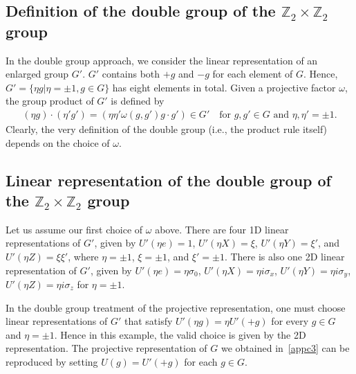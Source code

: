 \documentclass[3p,preprint]{elsarticle}
\begin{document}
\subsection{Definition of the double group of the $\mathbb{Z}_2\times\mathbb{Z}_2$ group}
In the double group approach, we consider the linear representation of an enlarged group $G'$. $G'$ contains both $+g$ and $-g$ for each element of $G$. Hence, $G'=\{\eta g|\eta=\pm1,g\in G\}$ has eight elements in total. Given a projective factor $\omega$, the group product of $G'$ is defined by
\begin{eqnarray}
(\eta g)\cdot (\eta' g')=(\eta\eta'\omega(g,g')g\cdot g')\in G' \quad \text{for } g,g'\in G \text{ and }\eta,\eta'=\pm1.
\end{eqnarray}
Clearly, the very definition of the double group (i.e., the product rule itself) depends on the choice of $\omega$.

\subsection{Linear representation of the double group of the $\mathbb{Z}_2\times\mathbb{Z}_2$ group}
Let us assume our first choice of $\omega$ above.  There are four 1D linear representations of $G'$, given by $U'(\eta e)=1$, $U'(\eta X)=\xi$, $U'(\eta Y)=\xi'$, and $U'(\eta Z)=\xi\xi'$, where $\eta=\pm1$, $\xi=\pm1$, and $\xi'=\pm1$. There is also one 2D linear representation of $G'$, given by $U'(\eta e)=\eta\sigma_0$, $U'(\eta X)=\eta i\sigma_x$, $U'(\eta Y)=\eta i\sigma_y$, $U'(\eta Z)=\eta i\sigma_z$ for $\eta=\pm1$. 

In the double group treatment of the projective representation, one must choose linear representations of $G'$ that satisfy $U'(\eta g)=\eta U'(+g)$ for every $g\in G$ and $\eta=\pm1$. Hence in this example, the valid choice is given by the 2D representation. The projective representation of $G$ we obtained in~\ref{appc3} can be reproduced by setting $U(g)=U'(+g)$ for each $g\in G$.



\end{document}
